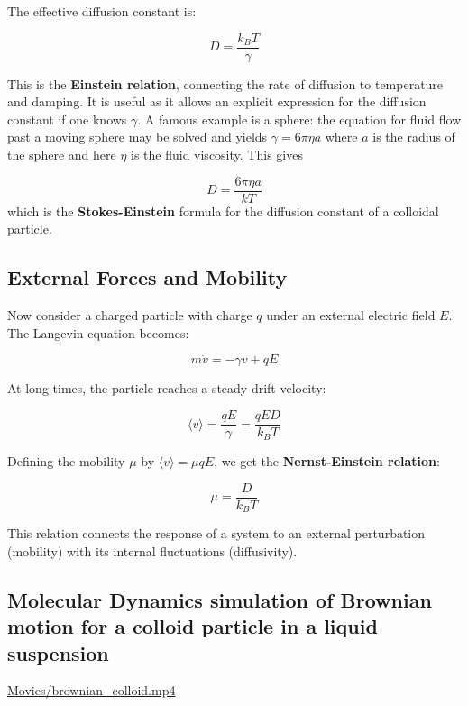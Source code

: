 \documentclass[
  letterpaper,
  enabledeprecatedfontcommands]{report}
\begin{document}
The effective diffusion constant is:

\[
D = \frac{k_B T}{\gamma}
\]

This is the \textbf{Einstein relation}, connecting the rate of diffusion
to temperature and damping. It is useful as it allows an explicit
expression for the diffusion constant if one knows \(\gamma\). A famous
example is a sphere: the equation for fluid flow past a moving sphere
may be solved and yields \(\gamma=6\pi\eta a\) where \(a\) is the radius
of the sphere and here \(\eta\) is the fluid viscosity. This gives

\[
D=\frac{6\pi\eta a}{kT}
\] which is the \textbf{Stokes-Einstein} formula for the diffusion
constant of a colloidal particle.

\subsection{External Forces and
Mobility}\label{external-forces-and-mobility}

Now consider a charged particle with charge \(q\) under an external
electric field \(E\). The Langevin equation becomes:

\[
m \dot{v} = -\gamma v + qE
\]

At long times, the particle reaches a steady drift velocity:

\[
\langle v \rangle = \frac{qE}{\gamma} = \frac{qED}{k_B T}
\]

Defining the mobility \(\mu\) by \(\langle v \rangle = \mu qE\), we get
the \textbf{Nernst-Einstein relation}:

\[
\mu = \frac{D}{k_B T}
\]

This relation connects the response of a system to an external
perturbation (mobility) with its internal fluctuations (diffusivity).

\subsection{Molecular Dynamics simulation of Brownian motion for a
colloid particle in a liquid
suspension}\label{molecular-dynamics-simulation-of-brownian-motion-for-a-colloid-particle-in-a-liquid-suspension}

\url{Movies/brownian_colloid.mp4}
\end{document}

